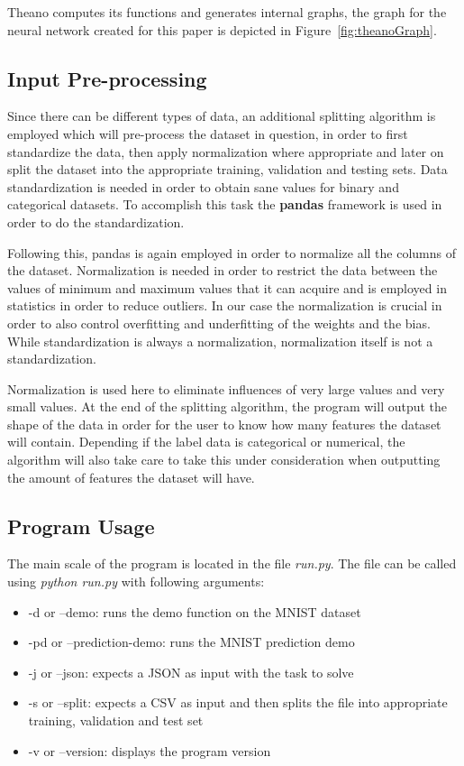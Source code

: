 \documentclass{article}
\begin{document}
Theano computes its functions and generates internal graphs, the graph for the neural network created for this paper is depicted in Figure~\ref{fig:theanoGraph}. 
\subsection{Input Pre-processing}
\label{sub:splitfunc}

Since there can be different types of data, an additional splitting algorithm is employed which will pre-process the dataset in question, in order to first standardize the data, then apply normalization where appropriate and later on split the dataset into the appropriate training, validation and testing sets. Data standardization is needed in order to obtain sane values for binary and categorical datasets. To accomplish this task the \textbf{pandas} framework is used in order to do the standardization. 

Following this, pandas is again employed in order to normalize all the columns of the dataset. Normalization is needed in order to restrict the data between the values of minimum and maximum values that it can acquire and is employed in statistics in order to reduce outliers. In our case the normalization is crucial in order to also control overfitting and underfitting of the weights and the bias. While standardization is always a normalization, normalization itself is not a standardization. 

Normalization is used here to eliminate influences of very large values and very small values. At the end of the splitting algorithm, the program will output the shape of the data in order for the user to know how many features the dataset will contain. Depending if the label data is categorical or numerical, the algorithm will also take care to take this under consideration when outputting the amount of features the dataset will have.

\subsection{Program Usage}
\label{sub:program}

The main scale of the program is located in the file \textit{run.py}. The file can be called using \textit{python run.py} with following arguments:
\begin{itemize}
    \item -d or --demo: runs the demo function on the MNIST dataset
    \item -pd or --prediction-demo: runs the MNIST prediction demo 
    \item -j or --json: expects a JSON as input with the task to solve
    \item -s or --split: expects a CSV as input and then splits the file into appropriate training, validation and test set
    \item -v or --version: displays the program version
\end{itemize}
\end{document}
